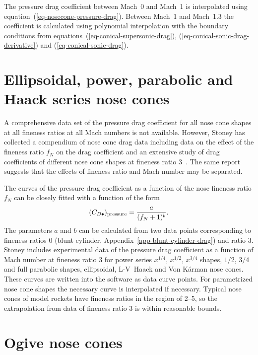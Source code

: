 The pressure drag coefficient between Mach~0 and Mach~1 is
interpolated using equation~(\ref{eq-nosecone-pressure-drag}).  
Between Mach~1 and Mach~1.3 the coefficient is calculated using
polynomial interpolation with the boundary conditions from
equations~(\ref{eq-conical-supersonic-drag}),
(\ref{eq-conical-sonic-drag-derivative}) and
(\ref{eq-conical-sonic-drag}).






\section{Ellipsoidal, power, parabolic and Haack series nose cones}
\label{app-haack-series-pressure-drag}

A comprehensive data set of the pressure drag coefficient for all nose
cone shapes at all fineness ratios at all Mach numbers is not
available.  However, Stoney has collected a compendium of nose cone
drag data including data on the effect of the fineness ratio $f_N$ on
the drag coefficient and an extensive study of drag coefficients of
different nose cone shapes at fineness ratio
3~\cite{nosecone-cd-data}.  The same report suggests that the effects 
of fineness ratio and Mach number may be separated.

The curves of the pressure drag coefficient as a function of the nose
fineness ratio $f_N$ can be closely fitted with a function of the form
%
\begin{equation}
(C_{D\bullet})_{\rm pressure} = \frac{a}{(f_N + 1)^b}.
\label{eq-fineness-ratio-drag-interpolator}
\end{equation}
%
The parameters $a$ and $b$ can be calculated from two data points
corresponding to fineness ratios 0 (blunt cylinder,
Appendix~\ref{app-blunt-cylinder-drag}) and ratio 3.  Stoney includes
experimental data of the pressure drag coefficient as a function of
Mach number at fineness ratio 3 for power series $x^{1/4}$, $x^{1/2}$,
$x^{3/4}$ shapes, $1/2$, $3/4$ and full parabolic shapes, ellipsoidal,
L-V~Haack and Von Kárman nose cones.  These curves are written into
the software as data curve points.  For parametrized nose cone shapes
the necessary curve is interpolated if 
necessary.  Typical nose cones of model rockets have fineness ratios
in the region of 2--5, so the extrapolation from data of fineness
ratio 3 is within reasonable bounds.





\section{Ogive nose cones}

